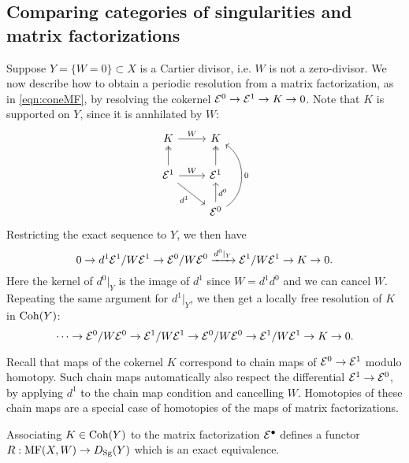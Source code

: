 \subsection{Comparing categories of singularities and matrix factorizations}
\label{subsec:comparison}

Suppose $Y=\{W=0\}\subset X$ is a Cartier divisor, i.e. $W$ is not a
zero-divisor. We now describe how to obtain a periodic resolution from a matrix
factorization, as in \eqref{eqn:coneMF}, by resolving the cokernel
$\mathcal{E}^0\to\mathcal{E}^1\to K\to0$. Note that $K$ is supported on $Y$, since it is
annhilated by $W$:
\begin{equation*}
    \begin{tikzcd}
        K \ar[r,"W"] & K \\
        \calE^1 \ar[r,"W"] \ar[dr,"d^1"'] \ar[u,two heads] &
        \calE^1 \ar[u,two heads] \\
        & \calE^0 \ar[u,"d^0"'] \ar[uu,bend right=60,"0"']
    \end{tikzcd}
\end{equation*}
Restricting the exact sequence to $Y$, we then have
\begin{equation*}
    0 \to d^1\mathcal{E}^1/W\mathcal{E}^1
        \to \mathcal{E}^0/W\mathcal{E}^0 \xrightarrow{d^0|_Y} \mathcal{E}^1/W\mathcal{E}^1 \to K \to 0.
\end{equation*}
Here the kernel of $d^0|_Y$ is the image of $d^1$ since $W=d^1d^0$ and we can
cancel $W$. Repeating the same argument for $d^1|_Y$, we then get a locally free
resolution of $K$ in $\operatorname{Coh}(Y)$:
\begin{equation*}
    \cdots \to \mathcal{E}^0/W\mathcal{E}^0 \to \mathcal{E}^1/W\mathcal{E}^1
        \to \mathcal{E}^0/W\mathcal{E}^0 \to \mathcal{E}^1/W\mathcal{E}^1 \to K \to 0.
\end{equation*}

\begin{remark}[label=rmk:MFchainmaps]{}{}
    Recall that maps of the cokernel $K$ correspond to chain maps of
    $\mathcal{E}^0\to\mathcal{E}^1$ modulo homotopy. Such chain maps automatically also
    respect the differential $\mathcal{E}^1\to\mathcal{E}^0$, by applying $d^1$ to the
    chain map condition and cancelling $W$. Homotopies of these chain maps are a
    special case of homotopies of the maps of matrix factorizations.
\end{remark}

\begin{proposition}{}{}
    Associating $K\in\operatorname{Coh}(Y)$ to the matrix factorization $\mathcal{E}^\bullet$
    defines a functor $R:\operatorname{MF}(X,W)\to D_{\mathrm{Sg}}(Y)$ which is an exact equivalence.
\end{proposition}

